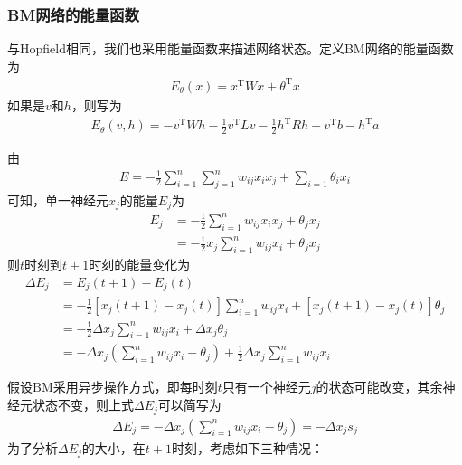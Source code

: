{        \subsubsection{BM网络的能量函数}
            \par
            与Hopfield相同，我们也采用能量函数来描述网络状态。定义BM网络的能量函数为
            \begin{align*}
            E_\theta(x) = x^\mathrm{T}Wx + \theta^\mathrm{T}x
            \end{align*}
            如果是$v$和$h$，则写为
            \begin{align*}
            E_\theta(v,h) = -v^\mathrm{T}Wh- \frac{1}{2} v^\mathrm{T}L v - \frac{1}{2} h^\mathrm{T} R h- v^\mathrm{T}b- h^\mathrm{T}a
            \end{align*}
            \par
            由
            \begin{align*}
            E = -\frac{1}{2} \sum_{i=1}^n\sum_{j=1}^n w_{ij}x_ix_j +\sum_{i=1}\theta_i x_i
            \end{align*}
            可知，单一神经元$x_j$的能量$E_j$为
            \begin{align*}
            E_j & = -\frac{1}{2}\sum_{i=1}^n w_{ij}x_ix_j+\theta_jx_j\\
            & =-\frac{1}{2} x_j\sum_{i=1}^n w_{ij}x_i + \theta_j x_j
            \end{align*}
            则$t$时刻到$t+1$时刻的能量变化为
            \begin{align*}
            \Delta E_j & = E_j(t+1) - E_j(t) \\
            & =-\frac{1}{2} [x_j(t+1) - x_j(t)] \sum_{i=1}^n w_{ij} x_i + [x_j(t+1) - x_j(t)]\theta_j\\
            & =-\frac{1}{2}\Delta x_j \sum_{i=1}^nw_{ij} x_i + \Delta x_j \theta_j\\
            & = -\Delta x_j \left( \sum_{i=1}^nw_{ij}x_i - \theta_j \right) + \frac{1}{2}\Delta x_j \sum_{i=1}^nw_{ij}x_i
            \end{align*}
            \par
            假设BM采用异步操作方式，即每时刻$t$只有一个神经元$j$的状态可能改变，其余神经元状态不变，则上式$\Delta E_j$可以简写为
            \begin{align*}
            \Delta E_j = -\Delta x_j \left( \sum_{i=1}^n w_{ij}x_i -\theta_j \right) = -\Delta x_js_j
            \end{align*}
            为了分析$\Delta E_j$的大小，在$t+1$时刻，考虑如下三种情况：
}
